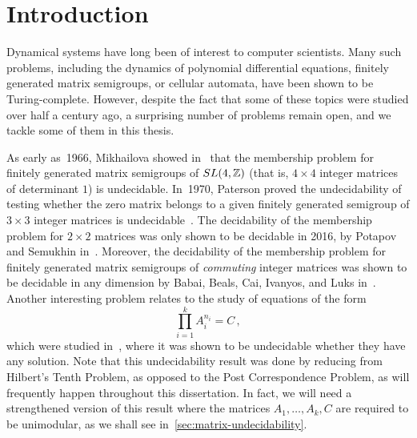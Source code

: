 \chapter{Introduction}
\label{sec:introduction}

Dynamical systems have long been of interest to computer scientists. Many such problems, including the dynamics of polynomial differential equations, finitely generated matrix semigroups, or cellular automata, have been shown to be Turing-complete. However, despite the fact that some of these topics were studied over half a century ago, a surprising number of problems remain open, and we tackle some of them in this thesis.

As early as~1966, Mikhailova showed in~\cite[in Russian]{Mik66} that the membership problem for finitely generated matrix semigroups of $SL(4,\mathbb{Z})$ (that is, $4\times 4$ integer matrices of determinant $1$) is undecidable.
In~1970, Paterson proved the undecidability of testing whether the zero matrix belongs to a given finitely generated semigroup of $3 \times 3$ integer matrices is undecidable~\cite{Paterson}.
The decidability of the membership problem for $2 \times 2$ matrices was only shown to be decidable in 2016, by Potapov and Semukhin in~\cite{PS2Z}.
Moreover, the decidability of the membership problem for finitely generated matrix semigroups of \emph{commuting} integer matrices was shown to be decidable in any dimension by Babai, Beals, Cai, Ivanyos, and Luks in~\cite{MultiplicativeMatrixEquations}.
Another interesting problem relates to the study of equations of the form
\begin{equation*}
  \prod\limits_{i=1}^{k} A_{i}^{n_{i}} = C \, ,
\end{equation*}
which were studied in~\cite{MEHTP}, where it was shown to be undecidable whether they have any solution. Note that this undecidability result was done by reducing from Hilbert's Tenth Problem, as opposed to the Post Correspondence Problem, as will frequently happen throughout this dissertation. In fact, we will need a strengthened version of this result where the matrices $A_{1}, \ldots, A_{k}, C$ are required to be unimodular, as we shall see in~\cref{sec:matrix-undecidability}.

